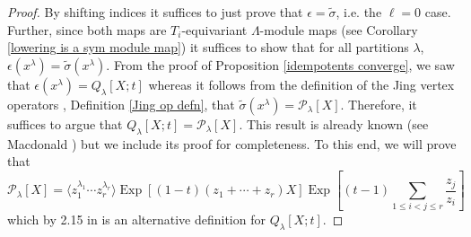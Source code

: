 \documentclass[11pt]{article}
\theoremstyle{definition}
\numberwithin{equation}{section}
\DeclareMathOperator{\EXP}{\mathrm{Exp}}
\begin{document}
\begin{proof}
    By shifting indices it suffices to just prove that $\epsilon = \widetilde{\sigma}$, i.e. the $\ell = 0$ case. Further, since both maps are $T_i$-equivariant $\Lambda$-module maps (see Corollary \ref{lowering is a sym module map}) it suffices to show that for all partitions $\lambda$, $\epsilon(x^{\lambda}) = \widetilde{\sigma}(x^{\lambda}).$ From the proof of Proposition \ref{idempotents converge}, we saw that $\epsilon(x^{\lambda}) = Q_{\lambda}[X;t]$ whereas it follows from the definition of the Jing vertex operators \cite{Jing_91}, Definition \ref{Jing op defn}, that $\widetilde{\sigma}(x^{\lambda}) = \mathcal{P}_{\lambda}[X]$. Therefore, it suffices to argue that $Q_{\lambda}[X;t] = \mathcal{P}_{\lambda}[X].$ This result is already known (see Macdonald \cite[Chapter 3, Section 5, Example $8$, page 238]{Macdonald}) but we include its proof for completeness. To this end, we will prove that 
    \begin{equation}\label{symmetrization-plthysm}
        \mathcal{P}_{\lambda}[X] = \langle z_1^{\lambda_1}\cdots z_r^{\lambda_r} \rangle \EXP[(1-t)(z_1+\cdots+z_r)X]\EXP\left[(t-1)\sum_{1\leq i < j \leq r} \frac{z_j}{z_i}\right]
    \end{equation}
 which by 2.15 in \cite[Chapter 3]{Macdonald} is an alternative definition for $Q_{\lambda}[X;t].$


\end{proof}
\end{document}
